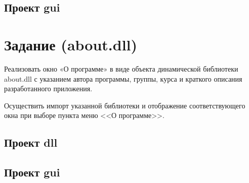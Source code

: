 





\subsection{Проект gui}






\section{Задание (about.dll)}

Реализовать окно «О программе» в виде объекта динамической библиотеки about.dll
с указанием автора программы, группы, курса и краткого описания разработанного приложения.

Осуществить импорт указанной библиотеки и отображение соответствующего окна при выборе пункта меню <<О программе>>.

\subsection{Проект dll}









\newpage

\subsection{Проект gui}



